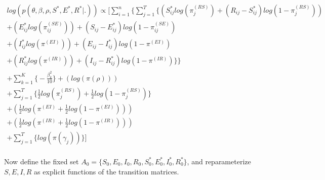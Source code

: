 \documentclass[12pt]{article}
\begin{document}
\begin{center}
\begin{multline}
\displaystyle
log(p(\theta,\beta,\rho,S^*,E^*,R^*|.)) \propto \Bigg[ 
    \sum_{i=1}^n \bigg\{ \sum_{j=1}^T
        \Big\{
            (S^*_{ij}log(\pi_j^{(RS)}) + (R_{ij} - S^*_{ij})log(1-\pi_j^{(RS)})) \\
            + (E^*_{ij}log(\pi_{ij}^{(SE)})) + (S_{ij} - E^*_{ij})log(1-\pi_{ij}^{(SE)}) \\
            + (I^*_{ij}log(\pi^{(EI)})) + (E_{ij} - I^*_{ij})log(1-\pi^{(EI)}) \\
            + (R^*_{ij}log(\pi^{(IR)})) + (I_{ij} - R^*_{ij})log(1-\pi^{(IR)}) \Big\}\bigg\} \\
    + \sum_{k = 1}^K\bigg\{-\frac{\beta^2_k}{10}\bigg\}
            + (log(\pi(\rho)))\\
            +  \sum_{j=1}^{T} \bigg\{\frac{1}{2}log(\pi^{(RS)}_j) + \frac{1}{2}log(1-\pi^{(RS)}_j)   \bigg\} \\
            + (\frac{1}{2}log(\pi^{(EI)} + \frac{1}{2}log(1-\pi^{(EI)}))) \\
            + (\frac{1}{2}log(\pi^{(IR)} + \frac{1}{2}log(1-\pi^{(IR)}))) \\
            + \sum_{j=1}^{T} \bigg\{ log(\pi(\gamma_j)) \bigg\}\Bigg]\\
\end{multline}
\end{center}

Now define the fixed set $A_0 = \{S_0, E_0, I_0, R_0, S^*_0, E^*_0, I^*_0, R^*_0\}$,
and reparameterize $S, E, I, R$ as explicit functions of the transition matrices. 
\end{document}
